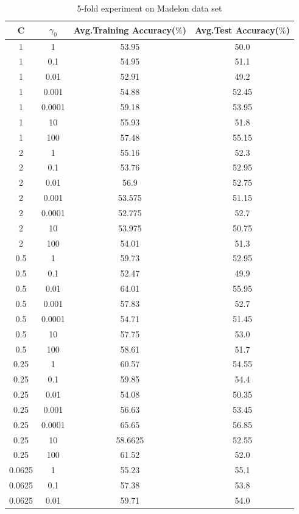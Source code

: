 \documentclass{article}
\begin{document}
 \begin{longtable}{c|c|c|c}
  \caption{5-fold experiment on Madelon data set} \\
  \hline\hline
	  C & $\gamma_0$ & Avg.Training Accuracy($\%$) & Avg.Test Accuracy($\%$) \\[1ex]
  \hline
	  1 & 1 & 53.95 & 50.0 \\
	  1 & 0.1 & 54.95 & 51.1 \\
	  1 & 0.01 & 52.91 & 49.2 \\
	  1 & 0.001 & 54.88 & 52.45 \\
	  1 & 0.0001 & 59.18 & 53.95 \\
	  1 & 10 & 55.93 & 51.8 \\
	  1 & 100 & 57.48 & 55.15 \\
	  2 & 1 & 55.16 & 52.3 \\
	  2 & 0.1 & 53.76 & 52.95 \\
	  2 & 0.01 & 56.9 & 52.75 \\
	  2 & 0.001 & 53.575 & 51.15 \\
	  2 & 0.0001 & 52.775 & 52.7 \\
	  2 & 10 & 53.975 & 50.75 \\
	  2 & 100 & 54.01 & 51.3 \\
	  0.5 & 1 & 59.73 & 52.95 \\
	  0.5 & 0.1 & 52.47 & 49.9 \\
	  0.5 & 0.01 & 64.01 & 55.95 \\
	  0.5 & 0.001 & 57.83 & 52.7 \\
	  0.5 & 0.0001 & 54.71 & 51.45 \\
	  0.5 & 10 & 57.75 & 53.0 \\
	  0.5 & 100 & 58.61 & 51.7 \\
	  0.25 & 1 & 60.57 & 54.55 \\
	  0.25 & 0.1 & 59.85 & 54.4 \\
	  0.25 & 0.01 & 54.08 & 50.35 \\
	  0.25 & 0.001 & 56.63 & 53.45 \\
	  0.25 & 0.0001 & 65.65 & 56.85 \\
	  0.25 & 10 & 58.6625 & 52.55 \\
	  0.25 & 100 & 61.52 & 52.0 \\
	  0.0625 & 1 & 55.23 & 55.1 \\
	  0.0625 & 0.1 & 57.38 & 53.8 \\
	  0.0625 & 0.01 & 59.71 & 54.0 \\

\end{longtable}
\end{document}
